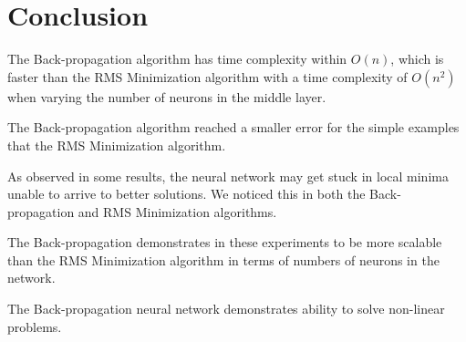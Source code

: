 \documentclass[11pt]{article}
\begin{document}


\section{Conclusion} %
\label{sec:conclusion}

The Back-propagation algorithm has time complexity within $O(n)$, which is faster than the RMS Minimization algorithm with a time
complexity of $O(n^{2})$ when varying the number of neurons in the middle layer. 

The Back-propagation algorithm reached a smaller error for the simple examples that the RMS Minimization algorithm.

As observed in some results, the neural network may get stuck in local minima unable to arrive to better solutions. We noticed this in
both the Back-propagation and RMS Minimization algorithms.

The Back-propagation demonstrates in these experiments to be more scalable than the RMS Minimization algorithm in terms of numbers of
neurons in the network. 

The Back-propagation neural network demonstrates ability to solve non-linear problems.



\end{document}
